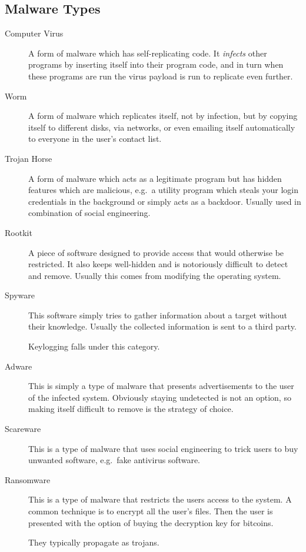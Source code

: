 \subsection{Malware Types}

\begin{frame}[allowframebreaks]
  \begin{description}
    \item[Computer Virus]
      A form of malware which has self-replicating code.
      It \emph{infects} other programs by inserting itself into their program 
      code, and in turn when these programs are run the virus payload is run to 
      replicate even further.

    \item[Worm]
      A form of malware which replicates itself, not by infection, but by 
      copying itself to different disks, via networks, or even emailing itself 
      automatically to everyone in the user's contact list.

    \item[Trojan Horse]
      A form of malware which acts as a legitimate program but has hidden 
      features which are malicious, e.g.\ a utility program which steals your 
      login credentials in the background or simply acts as a backdoor.
      Usually used in combination of social engineering.

    \item[Rootkit]
      A piece of software designed to provide access that would otherwise be 
      restricted.
      It also keeps well-hidden and is notoriously difficult to detect and 
      remove.
      Usually this comes from modifying the operating system.

    \item[Spyware]
      This software simply tries to gather information about a target without 
      their knowledge.
      Usually the collected information is sent to a third party.

      Keylogging falls under this category.

    \item[Adware]
      This is simply a type of malware that presents advertisements to the user
      of the infected system.
      Obviously staying undetected is not an option, so making itself difficult
      to remove is the strategy of choice.

    \item[Scareware]
      This is a type of malware that uses social engineering to trick users to 
      buy unwanted software, e.g.\ fake antivirus software.

    \item[Ransomware]
      This is a type of malware that restricts the users access to the system.
      A common technique is to encrypt all the user's files.
      Then the user is presented with the option of buying the decryption key 
      for bitcoins.

      They typically propagate as trojans.

  \end{description}
\end{frame}

